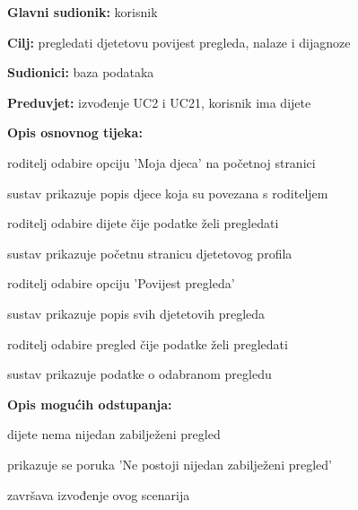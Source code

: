                     \noindent {}
					\begin{packed_item}
	
						\item \textbf{Glavni sudionik: }korisnik
						\item  \textbf{Cilj:} pregledati djetetovu povijest pregleda, nalaze i dijagnoze
						\item  \textbf{Sudionici:} baza podataka
						\item  \textbf{Preduvjet:} izvođenje UC2 i UC21, korisnik ima dijete
						\item  \textbf{Opis osnovnog tijeka:}
						
						\item[] \begin{packed_enum}
		
							\item roditelj odabire opciju 'Moja djeca' na početnoj stranici
							\item sustav prikazuje popis djece koja su povezana s roditeljem
							\item roditelj odabire dijete čije podatke želi pregledati
							\item sustav prikazuje početnu stranicu djetetovog profila
							\item roditelj odabire opciju 'Povijest pregleda'
							\item sustav prikazuje popis svih djetetovih pregleda
							\item roditelj odabire pregled čije podatke želi pregledati
							\item sustav prikazuje podatke o odabranom pregledu
						\end{packed_enum}
						\item  \textbf{Opis mogućih odstupanja:}
						
						\item[] \begin{packed_item}
							\item[6.a] dijete nema nijedan zabilježeni pregled
							\item[] 
							\begin{packed_enum} 
								\item prikazuje se poruka 'Ne postoji nijedan zabilježeni pregled'
								\item završava izvođenje ovog scenarija
								
							\end{packed_enum}
						\end{packed_item}
					\end{packed_item}

